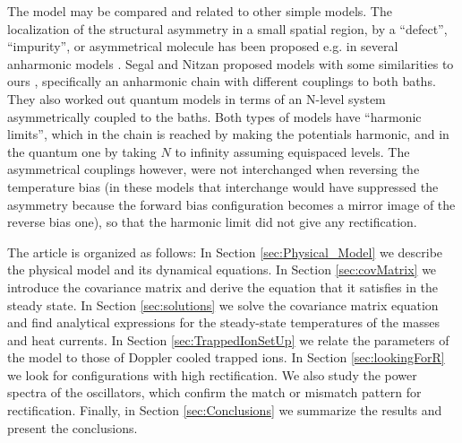 The model may be compared and related to other simple models. The localization of the
structural asymmetry in a  small spatial region, by a ``defect'', ``impurity'', or asymmetrical molecule has been proposed e.g. in
several anharmonic models \cite{Segal2005b,Pons2017,Alexander2020}.
Segal and Nitzan proposed models with some similarities to ours \cite{Segal2005,Segal2005b}, specifically an anharmonic chain
with different couplings to both baths. They also worked out  quantum models \cite{Segal2005,Segal2005b} in terms of an N-level
system asymmetrically coupled to the baths. Both types of models have ``harmonic limits'', which in the chain is reached by making the potentials
harmonic, and in the quantum one by taking $N$ to infinity assuming equispaced levels.
The asymmetrical couplings however, were not interchanged when reversing the temperature bias
(in these models that interchange would have suppressed the asymmetry because the forward bias configuration becomes a mirror image of the reverse bias one), so that
the harmonic limit did not give any rectification.










%
%

%

The article is organized as follows: In Section \ref{sec:Physical_Model}
we describe the physical model and its dynamical equations. In Section \ref{sec:covMatrix} we introduce the  covariance matrix and  derive the equation  that it satisfies in the steady state. In Section \ref{sec:solutions} we solve the covariance matrix equation and find analytical expressions for the steady-state temperatures of the masses and heat currents. In Section \ref{sec:TrappedIonSetUp} we relate the parameters of the model to those of Doppler cooled trapped ions. In Section \ref{sec:lookingForR} we look for configurations with high rectification. We also study the power spectra of the oscillators, which confirm the match or mismatch pattern for rectification. Finally, in Section \ref{sec:Conclusions} we summarize the results and present the conclusions.

